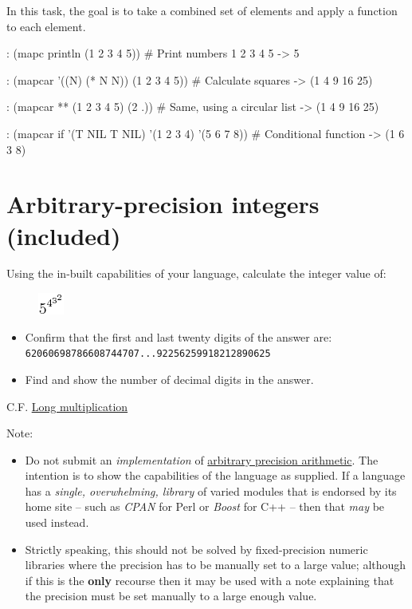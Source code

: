 In this task, the goal is to take a combined set of elements and apply a
function to each element.



\begin{wideverbatim}

: (mapc println (1 2 3 4 5))  # Print numbers
1
2
3
4
5
-> 5

: (mapcar '((N) (* N N)) (1 2 3 4 5))  # Calculate squares
-> (1 4 9 16 25)

: (mapcar ** (1 2 3 4 5) (2 .))  # Same, using a circular list
-> (1 4 9 16 25)

: (mapcar if '(T NIL T NIL) '(1 2 3 4) '(5 6 7 8))  # Conditional function
-> (1 6 3 8)

\end{wideverbatim}

\pagebreak{}
\section*{Arbitrary-precision integers (included)}


Using the in-built capabilities of your language, calculate the integer
value of:

\begin{figure}[htbp]
\centering
\includegraphics[scale=.9]{graphics/2869715b8204450d9946d9dd1966f50f.png}
\end{figure}

\begin{itemize}
\item
  Confirm that the first and last twenty digits of the answer are: \\
  \texttt{62060698786608744707...92256259918212890625}
\item
  Find and show the number of decimal digits in the answer.
\end{itemize}

C.F. \href{/wiki/Long\_multiplication}{Long multiplication}

Note:

\begin{itemize}
\item Do not submit an \emph{implementation} of
  \href{http://en.wikipedia.org/wiki/arbitrary\_precision\_arithmetic}{arbitrary
    precision arithmetic}. The intention is to show the capabilities
  of the language as supplied. If a language has a \emph{single,
    overwhelming, library} of varied modules that is endorsed by its
  home site -- such as \emph{CPAN} for Perl or \emph{Boost} for C++ --
  then that \emph{may} be used instead.
\item
  Strictly speaking, this should not be solved by fixed-precision
  numeric libraries where the precision has to be manually set to a
  large value; although if this is the \textbf{only} recourse then it
  may be used with a note explaining that the precision must be set
  manually to a large enough value.
\end{itemize}

